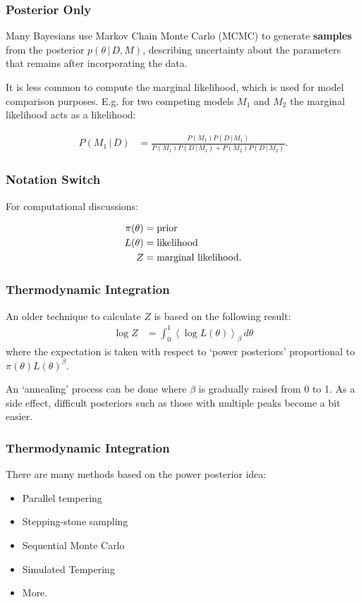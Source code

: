 \documentclass{beamer}
\newcommand{\given}{\,|\,}
\begin{document}
\begin{frame}
\frametitle{Posterior Only}
Many Bayesians use Markov Chain Monte Carlo (MCMC) to generate {\bf samples}
from the posterior $p(\theta \given D, M)$, describing uncertainty about the
parameters that remains after incorporating the data.\\[0.5em]\pause

It is less common to compute the marginal likelihood, which is used for
model comparison purposes. E.g. for two competing models $M_1$ and $M_2$
the marginal likelihood acts as a likelihood:

\begin{align}
P(M_1 \given D) &= \frac{P(M_1)P(D \given M_1)}
                        {P(M_1)P(D \given M_1) + P(M_2)P(D \given M_2)}.
\end{align}

\end{frame}


\begin{frame}
\frametitle{Notation Switch}
For computational discussions:

\begin{align}
\pi(\theta) &= \textnormal{prior} \\
L(\theta) &= \textnormal{likelihood} \\
Z &= \textnormal{marginal likelihood}.
\end{align}

\end{frame}


\begin{frame}
\frametitle{Thermodynamic Integration}
An older technique to calculate $Z$ is based on the following
result:
\begin{align}
\log Z &= \int_0^1 \left<\log L(\theta)\right>_\beta \, d\theta
\end{align}
\pause
where the expectation is taken with respect to `power posteriors'
proportional to $\pi(\theta)L(\theta)^\beta$. \\[0.5em]\pause

An `annealing' process can be done
where $\beta$ is gradually raised from 0 to 1. As a side effect, difficult
posteriors such as those with multiple peaks become a bit easier.

\end{frame}


\begin{frame}
\frametitle{Thermodynamic Integration}
There are many methods based on the power posterior idea:

\begin{itemize}
\item Parallel tempering
\item Stepping-stone sampling
\item Sequential Monte Carlo
\item Simulated Tempering
\item More.
\end{itemize}

\end{frame}
\end{document}
